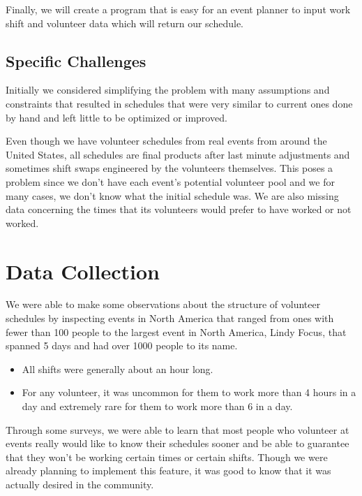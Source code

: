 \documentclass[12pt]{article}
\theoremstyle{definition}
\begin{document}
\begin{multicols}{2}
Finally, we will create a program that is easy for an event planner to input work shift and volunteer data which will return our schedule.

\subsection{Specific Challenges}
Initially we considered simplifying the problem with many assumptions and constraints that resulted in schedules that were very similar to current ones done by hand and left little to be optimized or improved.

Even though we have volunteer schedules from real events from around the United States, all schedules are final products after last minute adjustments and sometimes shift swaps engineered by the volunteers themselves.
This poses a problem since we don't have each event's potential volunteer pool and we for many cases, we don't know what the initial schedule was.
We are also missing data concerning the times that its volunteers would prefer to have worked or not worked.

\section{Data Collection}
We were able to make some observations about the structure of volunteer schedules by inspecting events in North America that ranged from ones with fewer than 100 people to the largest event in North America, Lindy Focus, that spanned 5 days and had over 1000 people to its name.
\begin{itemize}\itemsep0pt
\item All shifts were generally about an hour long.
\item For any volunteer, it was uncommon for them to work more than 4 hours in a day and extremely rare for them to work more than 6 in a day.
\end{itemize}

Through some surveys, we were able to learn that most people who volunteer at events really would like to know their schedules sooner and be able to guarantee that they won't be working certain times or certain shifts.
Though we were already planning to implement this feature, it was good to know that it was actually desired in the community.


\end{multicols}
\end{document}
